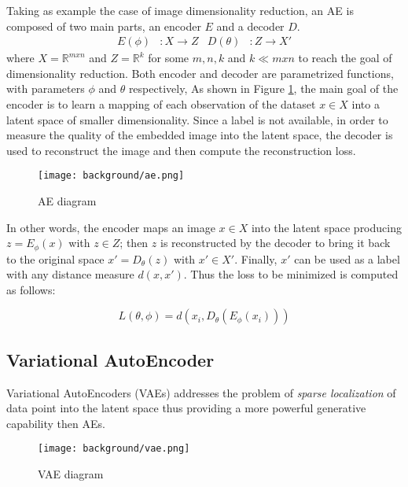 Taking as example the case of image dimensionality reduction, an AE is composed of two main parts, an encoder $E$ and a decoder $D$. 
\begin{align}
  E(\phi) &:  X \rightarrow Z & D(\theta) &:  Z \rightarrow X'
\end{align}
where $X = \mathbb{R}^{mxn}$ and $Z = \mathbb{R}^{k }$ for some $m,n,k$ and $k\ll mxn$ to reach the goal of dimensionality reduction. Both encoder and decoder are parametrized functions, with parameters $\phi$ and $\theta$ respectively,
As shown in Figure \ref{fig:ae}, the main goal of the encoder is to learn a mapping of each observation of the dataset $x \in X$ into a latent space of smaller dimensionality.  Since a label is not available, in order to measure the quality of the embedded image into the latent space, the decoder is used to reconstruct the image and then compute the reconstruction loss.

\begin{figure}[h]
  \begin{center}
    \texttt{[image: background/ae.png]}
  \end{center}
  \caption{AE diagram}
  \label{fig:ae}
\end{figure}

In other words, the encoder maps an image $x\in X$ into the latent space producing ${z=E_{\phi }(x)}$ with $z\in Z$; then $z$ is reconstructed by the decoder to bring it back to the original space ${x'=D_{\theta }(z)}$ with $x'\in X'$. Finally, $x'$ can be used as a label with any distance measure $d(x,x')$. Thus the loss to be minimized is computed as follows:

\begin{equation}
\label{eq:aeloss}
  L(\theta ,\phi ) = d(x_{i},D_{\theta }(E_{\phi }(x_{i})))
\end{equation}

\subsection{Variational AutoEncoder}

Variational AutoEncoders (VAEs) addresses the problem of \textit{sparse localization} of data point into the latent space thus providing a more powerful generative capability then AEs.

\begin{figure}[h]
  \begin{center}
    \texttt{[image: background/vae.png]}
  \end{center}
  \caption{VAE diagram}
  \label{fig:vae}
\end{figure}

